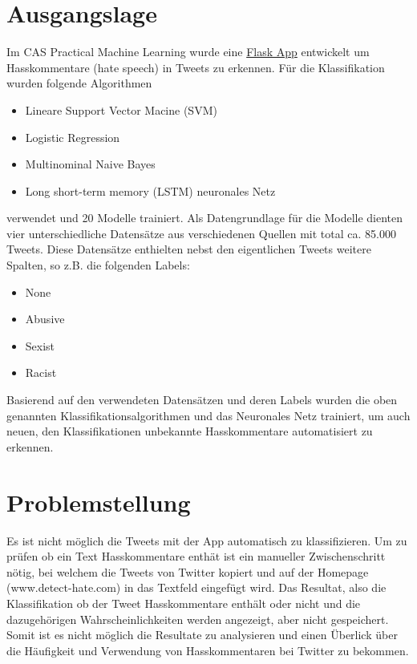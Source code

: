                                                                                                                                                                                                                                                                                                                                                       \section{Ausgangslage}
\label{sec:introduction_purpose}

Im CAS Practical Machine Learning wurde eine \href{http://www.detect-hate.com}{Flask App} entwickelt um Hasskommentare (hate speech) in Tweets zu erkennen. F{\"u}r die Klassifikation wurden folgende Algorithmen
\begin{itemize}
\item Lineare Support Vector Macine (SVM)
\item Logistic Regression
\item Multinominal Naive Bayes
\item Long short-term memory (LSTM) neuronales Netz
\end{itemize}
verwendet und 20 Modelle trainiert. Als Datengrundlage f{\"u}r die Modelle dienten vier unterschiedliche Datens{\"a}tze aus verschiedenen Quellen mit total ca. 85.000 Tweets. Diese Datens{\"a}tze enthielten nebst den eigentlichen Tweets weitere Spalten, so z.B. die folgenden Labels:
\begin{itemize}
  \item None
  \item Abusive
  \item Sexist
  \item Racist
\end{itemize}
Basierend auf den verwendeten Datens{\"a}tzen und deren Labels wurden die oben genannten Klassifikationsalgorithmen und das Neuronales Netz trainiert, um auch neuen, den Klassifikationen unbekannte Hasskommentare automatisiert zu erkennen. 

\section{Problemstellung }
\label{sec:introduction_	purpose}
Es ist nicht m{\"o}glich die Tweets mit der App automatisch zu klassifizieren. Um zu pr{\"u}fen ob ein Text Hasskommentare enth{\"a}t ist ein manueller Zwischenschritt n{\"o}tig, bei welchem die Tweets von Twitter kopiert und auf der Homepage (www.detect-hate.com) in das Textfeld eingef{\"u}gt wird. Das Resultat, also die Klassifikation ob der Tweet Hasskommentare enth{\"a}lt oder nicht und die dazugeh{\"o}rigen Wahrscheinlichkeiten werden angezeigt, aber nicht gespeichert. Somit ist es nicht m{\"o}glich die Resultate zu analysieren und einen {\"U}berlick {\"u}ber die H{\"a}ufigkeit und Verwendung von Hasskommentaren bei Twitter zu bekommen.

